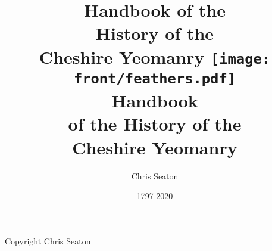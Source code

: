 \documentclass[a4paper,7pt]{book}
\title{Handbook of the \\ History of the \\ Cheshire Yeomanry}
\author{Chris Seaton}
\date{1797-2020}
\title{
  \texttt{[image: front/feathers.pdf]} \\
  \vspace{10mm}
  \huge Handbook \\
  \vspace{2mm}
  \Large of the History of the \\
  \Huge Cheshire Yeomanry
}
\begin{document}
\frontmatter

\maketitle

\vspace*{\fill}

\begin{center}
  Copyright  Chris Seaton
\end{center}

\setcounter{tocdepth}{0}
\tableofcontents{}

\mainmatter






\end{document}
